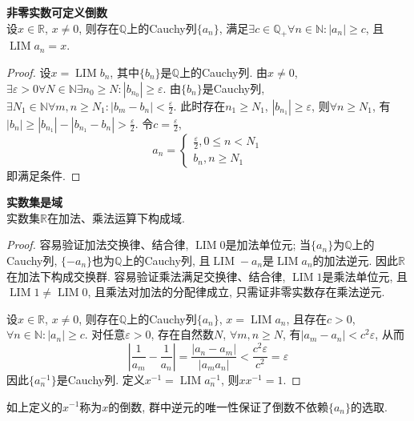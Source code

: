 \begin{lem} \textbf{非零实数可定义倒数}\\
设$x\in \mathbb{R}$, $x\neq 0$, 则存在$\mathbb{Q}$上的Cauchy列$\{a_n\}$, 满足$\exists c\in \mathbb{Q}_+ \forall n\in \mathbb{N}: |a_n|\ge c$, 且$\operatorname{LIM} a_n =x$.  
\end{lem}
\begin{proof}
设$x=\operatorname{LIM} b_n$, 其中$\{b_n\}$是$\mathbb{Q}$上的Cauchy列. 由$x\neq 0$, $\exists \varepsilon>0 \forall N \in \mathbb{N}\exists n_0\ge N: |b_{n_0}|\ge \varepsilon$. 由$\{b_n\}$是Cauchy列, $\exists N_1 \in \mathbb{N}\forall m,n\ge N_1: |b_m-b_n|<\frac{\varepsilon}{2}$. 此时存在$n_1\ge N_1$, $|b_{n_1}|\ge \varepsilon$, 则$\forall n\ge N_1$, 有$|b_n|\ge |b_{n_1}|-|b_{n_1}-b_n| > \frac{\varepsilon}{2}$. 令$c=\frac{\varepsilon}{2}$, 
\begin{equation}
    a_n=\begin{cases}
        \frac{\varepsilon}{2}, 0\le n< N_1\\
        b_n, n\ge N_1
    \end{cases}
\end{equation}
即满足条件. 
\end{proof}

\begin{pro}\textbf{实数集是域}\\
实数集$\mathbb{R}$在加法、乘法运算下构成域. 
\end{pro}
\begin{proof}
容易验证加法交换律、结合律, $\operatorname{LIM}0$是加法单位元; 当$\{a_n\}$为$\mathbb{Q}$上的Cauchy列, $\{-a_n\}$也为$\mathbb{Q}$上的Cauchy列, 且$\operatorname{LIM}-a_n$是$\operatorname{LIM}a_n$的加法逆元. 因此$\mathbb{R}$在加法下构成交换群. 容易验证乘法满足交换律、结合律, $\operatorname{LIM}1$是乘法单位元, 且$\operatorname{LIM}1\neq \operatorname{LIM}0$, 且乘法对加法的分配律成立, 只需证非零实数存在乘法逆元.
\par 设$x\in \mathbb{R}$, $x\neq 0$, 则存在$\mathbb{Q}$上的Cauchy列$\{a_n\}$, $ x=\operatorname{LIM} a_n$, 且存在$c>0$, $\forall n\in \mathbb{N}: |a_n|\ge c$. 对任意$\varepsilon>0$, 存在自然数$N$, $\forall m,n\ge N$, 有$|a_m-a_n|<c^2\varepsilon$, 从而
\begin{equation}
    \left|\frac{1}{a_m}-\frac{1}{a_n}\right| = \frac{|a_n-a_m|}{|a_ma_n|} < \frac{c^2\varepsilon}{c^2} = \varepsilon
\end{equation}
因此$\{a_n^{-1}\}$是Cauchy列. 定义$x^{-1}=\operatorname{LIM} a_n^{-1}$, 则$xx^{-1}=1$. 
\end{proof}
\par 如上定义的$x^{-1}$称为$x$的倒数, 群中逆元的唯一性保证了倒数不依赖$\{a_n\}$的选取. 

